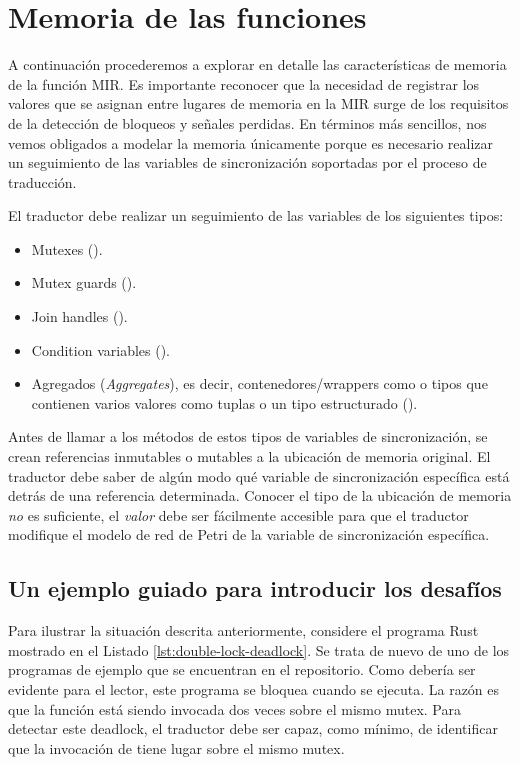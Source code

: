 \section{Memoria de las funciones}

A continuación procederemos a explorar en detalle las características de memoria de la función
\acrshort{MIR}. Es importante reconocer que la necesidad de registrar los valores que se asignan entre
lugares de memoria en la \acrshort{MIR} surge de los requisitos de la detección de bloqueos y
señales perdidas. En términos más sencillos, nos vemos obligados a modelar la memoria
únicamente porque es necesario realizar un seguimiento de las variables de sincronización
soportadas por el proceso de traducción.

El traductor debe realizar un seguimiento de las variables de los siguientes tipos:

\begin{itemize}
  \item Mutexes ().
  \item Mutex guards ().
  \item Join handles ().
  \item Condition variables ().
  \item Agregados (\emph{Aggregates}), es decir, contenedores/wrappers como  o tipos que contienen varios
        valores como tuplas o un tipo estructurado ().
\end{itemize}

Antes de llamar a los métodos de estos tipos de variables de sincronización, se crean
referencias inmutables o mutables a la ubicación de memoria original. El traductor debe saber
de algún modo qué variable de sincronización específica está detrás de una referencia
determinada. Conocer el tipo de la ubicación de memoria \emph{no} es suficiente, el \emph{valor} debe ser
fácilmente accesible para que el traductor modifique el modelo de red de Petri de la variable de
sincronización específica.

\subsection{Un ejemplo guiado para introducir los desafíos}

Para ilustrar la situación descrita anteriormente, considere el programa Rust mostrado en el
Listado \ref{lst:double-lock-deadlock}. Se trata de nuevo de uno de los programas de ejemplo que se encuentran en el
repositorio. Como debería ser evidente para el lector, este programa se bloquea cuando se
ejecuta.
La razón es que la función  está siendo invocada dos veces sobre el mismo mutex.
Para detectar este deadlock, el traductor debe ser capaz, como mínimo, de identificar que la invocación de 
tiene lugar sobre el mismo mutex.

